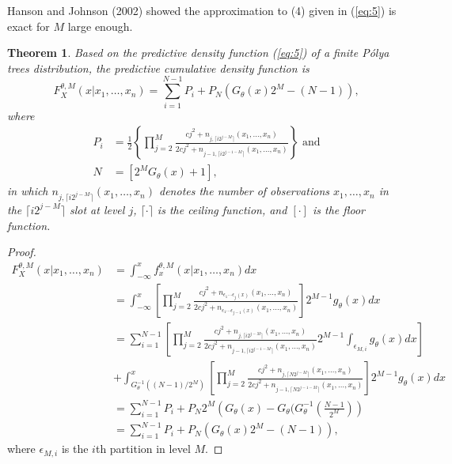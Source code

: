 \documentclass[12pt]{article}
\newtheorem{thm}{Theorem}[subsection]
\newcommand{\polya}{P\'{o}lya}
\begin{document}
Hanson and Johnson (2002) showed the approximation to (4) given in
(\ref{eq:5}) is exact for $M$ large enough.

\begin{thm}
Based on the predictive density function (\ref{eq:5}) of a
finite \polya{} trees distribution, 
the predictive cumulative density function is 
\begin{equation}
\label{eq:6}
F^{\theta,M}_X(x|x_1, \ldots, x_n) = \sum_{i=1}^{N-1} P_{i} + P_N
\left( G_{\theta}(x)2^M -(N-1) \right),
\end{equation}
where
\begin{align*}
P_i &= \frac{1}{2} \left\{\prod_{j=2}^M \frac{cj^2 + n_{j,\lceil i2^{j-M}
  \rceil}(x_1, \ldots, x_n)}{2cj^2 + n_{j-1,\lceil
  i2^{j-1-M} \rceil}(x_{1 },\ldots, x_n)} \right\} \mbox{ and}\\
N & = \left[ 2^{M } G_{\theta}(x)   +1\right],
\end{align*}
in which $n_{j,\lceil i2^{j-M}
  \rceil}(x_1, \ldots, x_n)$ denotes the number of observations $x_1,
\ldots, x_n$ in the $\lceil i2^{j-M}
  \rceil$ slot at level $j$, $\lceil \cdot
  \rceil$ is the ceiling function, and $[ \cdot ]$ is the floor function. 
\end{thm}

\begin{proof}
\begin{align*}
F^{\theta,M}_X(x| x_1, \ldots, x_n) & = \int_{-\infty}^x
f_x^{\theta,M} (x|x_1, \ldots, x_n) dx \\
& = \int_{-\infty}^x \left[
  \prod_{j=2}^M \frac{cj^2 + n_{\epsilon_1 \cdots \epsilon_j(x) }(x_1 , \ldots, x_n)}{2cj^2
  + n_{\epsilon_1 \cdots \epsilon_{j-1}(x)}(x_1, \ldots, x_n)}
\right]2^{M-1} g_\theta(x) dx \\
& =  \sum_{i=1}^{N-1} \left[ \prod_{j=2}^M \frac{cj^2 + n_{j, \lceil i2^{j-M}
  \rceil}(x_1,
    \ldots, x_n)}{2cj^2 + n_{j-1, \lceil i2^{j-1-M}
  \rceil}(x_1, \ldots, x_n)} 2^{M-1}
  \int_{\epsilon_{M,i}} g_{\theta}(x) dx \right] \\
&+ 
\int_{G^{-1}_{\theta}((N-1)/2^M)}^x \left[ \prod_{j=2}^M \frac{cj^2 + n_{j, \lceil N2^{j-M}
  \rceil}(x_1,
    \ldots, x_n)}{2cj^2 + n_{j-1, \lceil N2^{j-1-M}
  \rceil}(x_1, \ldots, x_n)}\right] 2^{M-1}
   g_{\theta}(x) dx \\
& = \sum_{i=1}^{N-1} P_i + P_N 2^M \left( G_{\theta}(x) -
  G_{\theta}(G_{\theta}^{-1}\left( \frac{N-1}{2^M} \right)\right)\\
& = \sum_{i=1}^{N-1}P_i + P_N \left( G_{\theta}(x) 2^M - (N-1) \right),
\end{align*}
where $\epsilon_{M,i}$ is the $i$th partition in level $M$. 
\end{proof}
\end{document}
